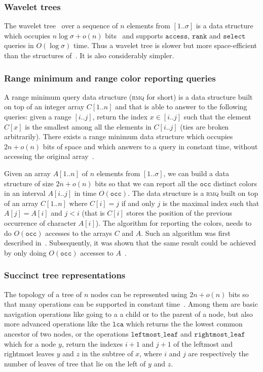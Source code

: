 \documentclass[a4paper]{article}
\begin{document}
\subsubsection{Wavelet trees}
The wavelet tree~\cite{GGV03} over a sequence of $n$ elements from $[1..\sigma]$ 
is a data structure which occupies $n\log\sigma+o(n)$ bits~\cite{GGGRS07} and supports 
$\mathtt{access}$, $\mathtt{rank}$ and $\mathtt{select}$ queries in $O(\log\sigma)$ time. 
Thus a wavelet tree is slower but more space-efficient 
than the structures of~\cite{GMR06}. It is also considerably simpler. 


\subsubsection{Range minimum and range color reporting queries}

A range minimum query data structure (\textsc{rmq} for short)
is a data structure built on top of an integer 
array $C[1..n]$ and that is able to answer to the following queries: given 
a range $[i..j]$, return the index $x\in[i..j]$ such that the element 
$C[x]$ is the smallest among all the elements in $C[i..j]$ (ties are broken 
arbitrarily). There exists a range minimum data structure which occupies $2n+o(n)$
bits of space and which answers to a query in constant time, without 
accessing the original array~\cite{Fi10}. 


Given an array $A[1..n]$ of $n$ elements from $[1..\sigma]$, we can build a data structure of size $2n+o(n)$ bits 
so that we can report all the $\mathtt{occ}$ distinct colors in an interval $A[i..j]$ in time $O(\mathtt{occ})$. 
The data structure is a \textsc{rmq} built on top of an array $C[1..n]$ where $C[i]=j$ 
if and only $j$ is the maximal index such that $A[j]=A[i]$ and $j<i$ (that 
is $C[i]$ stores the position of the previous occurrence of character $A[i]$). 
The algorithm for reporting the colors, needs 
to do $O(\mathtt{occ})$ accesses to the arrays $C$ and $A$. 
Such an algorithm was first described in~\cite{Mu02}. 
Subsequently, it was shown that the same result could be 
achieved by only doing $O(\mathtt{occ})$ accesses to $A$~\cite{Sa07b}. 


\subsubsection{Succinct tree representations}
The topology of a tree of $n$ nodes can be represented using $2n+o(n)$ bits so that 
many operations can be supported in constant time~\cite{NStalg14}. Among them are basic 
navigation operations like going to a a child or to the parent of a node, but also more 
advanced operations like the $\mathtt{lca}$ which returns the 
the lowest common ancestor of two nodes, or the operations $\mathtt{leftmost\_leaf}$ and 
$\mathtt{rightmost\_leaf}$ which for a node $y$, return the indexes $i+1$ and $j+1$ 
of the leftmost and rightmost leaves $y$ and $z$
in the subtree of $x$, where $i$ and $j$ are respectively
the number of leaves of tree that lie on the left of $y$ and $z$. 
 
\end{document}
